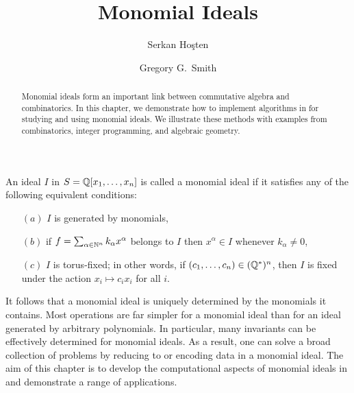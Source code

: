 \title{Monomial Ideals}
\author{Serkan Ho\c{s}ten
        \and Gregory G.~Smith
        }
\maketitle

\newtheorem*{sproof}{Proof of Proposition}{\itshape}{\rmfamily}

\newcommand{\supp}{\operatorname{supp}}
\newcommand{\depth}{\operatorname{depth}}
\newcommand{\GL}{\operatorname{GL}}
\newcommand{\initial}{\operatorname{in}}
\newcommand{\Hilb}{\operatorname{Hilb}}
\newcommand{\codim}{\operatorname{codim}}
\newcommand{\sg}{{\sf g}}
\newcommand{\IP}{\operatorname{IP}}

\begin{abstract}
Monomial ideals form an important link between commutative algebra and
combinatorics.  In this chapter, we demonstrate how to implement
algorithms in \Mtwo for studying and using monomial ideals.  We
illustrate these methods with examples from combinatorics, integer
programming, and algebraic geometry.
\end{abstract}



An ideal $I$ in $S = {\mathbb Q}[x_{1}, \dotsc, x_{n}]$ is called a monomial
ideal if it satisfies any
of the following equivalent conditions:
\begin{enumerate}
\item[$(a)$] $I$ is generated by monomials,
\item[$(b)$] if $f = \sum_{\alpha \in {\mathbb N}^{n}} k_{\alpha}
x^{\alpha}$ belongs to $I$ then $x^{\alpha} \in I$ whenever
$k_{\alpha} \neq 0$,
\item[$(c)$] $I$ is torus-fixed; in other words, if $(c_{1}, \dotsc,
c_{n}) \in ({\mathbb Q}^{*})^{n}$, then $I$ is fixed under the action $x_{i}
\mapsto c_{i}x_{i}$ for all $i$.
\end{enumerate}
It follows that a monomial ideal is uniquely determined by the
monomials it contains.  Most operations are far simpler for a
monomial ideal than for an ideal generated by arbitrary polynomials.
In particular, many invariants can be effectively determined for
monomial ideals.  As a result, one can solve a broad collection of
problems by reducing to or encoding data in a monomial ideal.  The aim
of this chapter is to develop the computational aspects of monomial
ideals in \Mtwo and demonstrate a range of applications.

